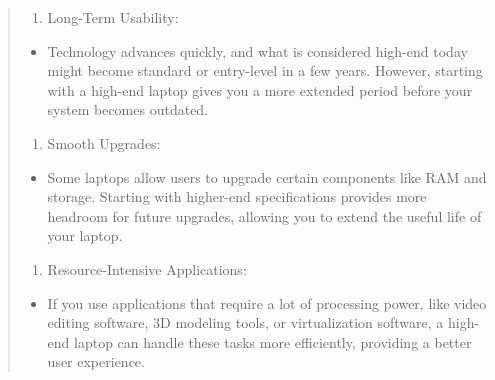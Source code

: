 \begin{leftbar}
\begin{quote}
 \begin{enumerate}[leftmargin=*]
 \def\labelenumi{\arabic{enumi}.}
 \setcounter{enumi}{3}
 
 \item
 Long-Term Usability:
 \end{enumerate}
 
 \begin{itemize}
 
 \item
 Technology advances quickly, and what is considered high-end today might become standard or entry-level in a few years. However, starting with a high-end laptop gives you a more extended period before your system becomes outdated.
 \end{itemize}
 
 \begin{enumerate}[leftmargin=*]
 \def\labelenumi{\arabic{enumi}.}
 \setcounter{enumi}{4}
 
 \item
 Smooth Upgrades:
 \end{enumerate}
 
 \begin{itemize}
 
 \item
 Some laptops allow users to upgrade certain components like RAM and storage. Starting with higher-end specifications provides more headroom for future upgrades, allowing you to extend the useful life of your laptop.
 \end{itemize}
 
 \begin{enumerate}[leftmargin=*]
 \def\labelenumi{\arabic{enumi}.}
 \setcounter{enumi}{5}
 
 \item
 Resource-Intensive Applications:
 \end{enumerate}
 
 \begin{itemize}
 
 \item
 If you use applications that require a lot of processing power, like video editing software, 3D modeling tools, or virtualization software, a high-end laptop can handle these tasks more efficiently, providing a better user experience.
 \end{itemize}
 
 \begin{enumerate}[leftmargin=*]
 \def\labelenumi{\arabic{enumi}.}
 \setcounter{enumi}{6}
 

\end{enumerate}
\end{quote}
\end{leftbar}

